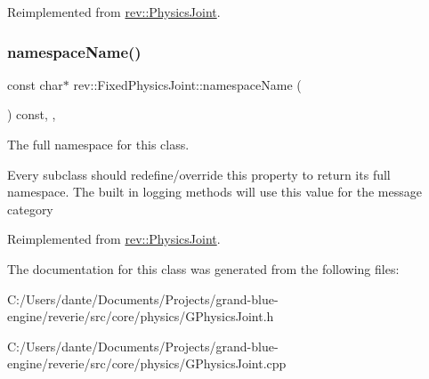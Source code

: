 Reimplemented from \mbox{\hyperlink{classrev_1_1_physics_joint_aef7f21c8a657ce02326b965af8835517}{rev\+::\+Physics\+Joint}}.

\mbox{\label{classrev_1_1_fixed_physics_joint_ae0bb4a64e824f0cc378b9e00be7ab469}} 
\subsubsection{\texorpdfstring{namespaceName()}{namespaceName()}}
{\footnotesize\ttfamily const char$\ast$ rev\+::\+Fixed\+Physics\+Joint\+::namespace\+Name (\begin{DoxyParamCaption}{ }\end{DoxyParamCaption}) const\hspace{0.3cm}{\ttfamily [inline]}, {\ttfamily [override]}, {\ttfamily [virtual]}}



The full namespace for this class. 

Every subclass should redefine/override this property to return its full namespace. The built in logging methods will use this value for the message category 

Reimplemented from \mbox{\hyperlink{classrev_1_1_physics_joint_a312be29fc0f85bacb01952c63e985096}{rev\+::\+Physics\+Joint}}.



The documentation for this class was generated from the following files\+:\begin{DoxyCompactItemize}
\item 
C\+:/\+Users/dante/\+Documents/\+Projects/grand-\/blue-\/engine/reverie/src/core/physics/G\+Physics\+Joint.\+h\item 
C\+:/\+Users/dante/\+Documents/\+Projects/grand-\/blue-\/engine/reverie/src/core/physics/G\+Physics\+Joint.\+cpp\end{DoxyCompactItemize}
